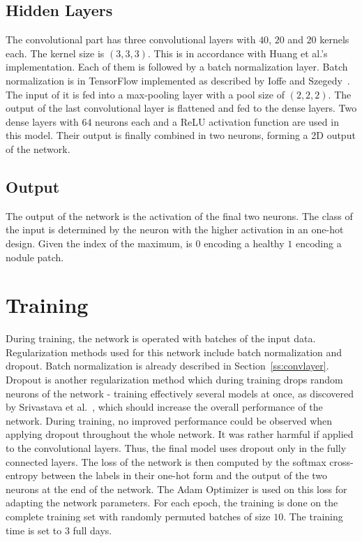 \documentclass[main.tex]{subfiles}
\begin{document}
\subsection{Hidden Layers}
The convolutional part has three convolutional layers with $40$, $20$ and $20$ kernels each. The kernel size is $(3,3,3)$. This is in accordance with Huang et al.'s~\cite{huang2017lung} implementation. Each of them is followed by a batch normalization layer. Batch normalization is in TensorFlow implemented as described by Ioffe and Szegedy~\cite{ioffe2015batch}. The input of it is fed into a max-pooling layer with a pool size of $(2,2,2)$. The output of the last convolutional layer is flattened and fed to the dense layers. Two dense layers with $64$ neurons each and a ReLU activation function are used in this model. Their output is finally combined in two neurons, forming a 2D output of the network. 


\subsection{Output}
The output of the network is the activation of the final two neurons. The class of the input is determined by the neuron with the higher activation in an one-hot design. Given the index of the maximum, is $0$ encoding a healthy $1$ encoding a nodule patch.


\section{Training}
During training, the network is operated with batches of the input data. Regularization methods used for this network include batch normalization and dropout. Batch normalization is already described in Section~\ref{ss:convlayer}. Dropout is another regularization method which during training drops random neurons of the network - training effectively several models at once, as discovered by Srivastava et al.~\cite{srivastava2014dropout}, which should increase the overall performance of the network. During training, no improved performance could be observed when applying dropout throughout the whole network. It was rather harmful if applied to the convolutional layers. Thus, the final model uses dropout only in the fully connected layers. The loss of the network is then computed by the softmax cross-entropy between the labels in their one-hot form and the output of the two neurons at the end of the network. The Adam Optimizer is used on this loss for adapting the network parameters. For each epoch, the training is done on the complete training set with randomly permuted batches of size $10$. The training time is set to 3 full days.
                                                 
\end{document}

